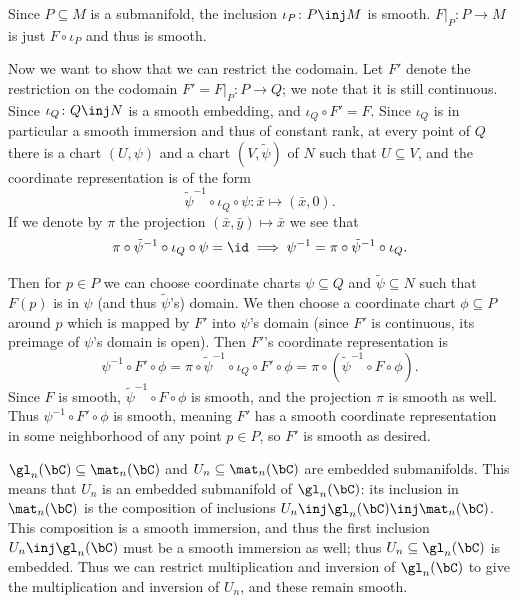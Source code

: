     \item Since $P\subseteq M$ is a submanifold, the inclusion $\iota_P\colon P\inj M$ is smooth.
    $F|_P\colon P\to M$ is just $F\circ\iota_P$ and thus is smooth.

    Now we want to show that we can restrict the codomain.
    Let $F'$ denote the restriction on the codomain $F'=F|_P\colon P\to Q$; we note that it is still continuous.
    Since $\iota_Q\colon Q\inj N$ is a smooth embedding, and $\iota_Q\circ F'=F$.
    Since $\iota_Q$ is in particular a smooth immersion and thus of constant rank, at every point of $Q$ there is a chart $(U,\psi)$
    and a chart $(V,\tilde\psi)$ of $N$ such that $U\subseteq V$, and the coordinate representation is of the form
    $$ \tilde\psi^{-1}\circ\iota_Q\circ\psi\colon \bar x\mapsto(\bar x,0) . $$
    If we denote by $\pi$ the projection $(\bar x,\bar y)\mapsto\bar x$ we see that
    $$ \pi\circ\tilde\psi^{-1}\circ\iota_Q\circ\psi = \id \implies \psi^{-1} = \pi\circ\tilde\psi^{-1}\circ\iota_Q . $$

    Then for $p\in P$ we can choose coordinate charts $\psi\subseteq Q$ and $\tilde\psi\subseteq N$ such that $F(p)$ is in $\psi$ (and thus $\tilde\psi$'s) domain.
    We then choose a coordinate chart $\phi\subseteq P$ around $p$ which is mapped by $F'$ into $\psi$'s domain (since $F'$ is continuous, its preimage of $\psi$'s
    domain is open).
    Then $F'$'s coordinate representation is
    $$ \psi^{-1}\circ F'\circ\phi = \pi\circ\tilde\psi^{-1}\circ\iota_Q\circ F'\circ\phi = \pi\circ(\tilde\psi^{-1}\circ F\circ\phi) . $$
    Since $F$ is smooth, $\tilde\psi^{-1}\circ F\circ\phi$ is smooth, and the projection $\pi$ is smooth as well.
    Thus $\psi^{-1}\circ F'\circ\phi$ is smooth, meaning $F'$ has a smooth coordinate representation in some neighborhood of any point $p\in P$, so $F'$ is smooth
    as desired.

    \item $\gl_n(\bC)\subseteq\mat_n(\bC)$ and $U_n\subseteq\mat_n(\bC)$ are embedded submanifolds.
    This means that $U_n$ is an embedded submanifold of $\gl_n(\bC)$: its inclusion in $\mat_n(\bC)$ is the composition of inclusions $U_n\inj\gl_n(\bC)\inj\mat_n(\bC)$.
    This composition is a smooth immersion, and thus the first inclusion $U_n\inj\gl_n(\bC)$ must be a smooth immersion as well; thus $U_n\subseteq\gl_n(\bC)$ is
    embedded.
    Thus we can restrict multiplication and inversion of $\gl_n(\bC)$ to give the multiplication and inversion of $U_n$, and these remain smooth.

